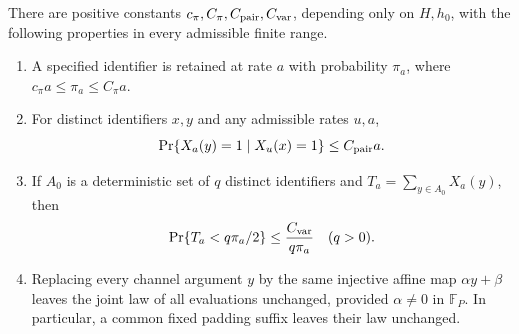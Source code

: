 \begin{lemma}\label{lem:env-ranks}
There are positive constants $c_\pi,C_\pi,C_{\rm pair},C_{\rm var}$,
depending only on $H,h_0$, with the following properties in every
admissible finite range.
\begin{enumerate}
\item A specified identifier is retained at rate $a$ with probability
$\pi_a$, where $c_\pi a\le\pi_a\le C_\pi a$.
\item For distinct identifiers $x,y$ and any admissible rates $u,a$,
\[
\Pr\{X_a(y)=1\mid X_u(x)=1\}\le C_{\rm pair}a.
\]
\item If $A_0$ is a deterministic set of $q$ distinct identifiers and
$T_a=\sum_{y\in A_0}X_a(y)$, then
\[
\Pr\{T_a<q\pi_a/2\}\le \frac{C_{\rm var}}{q\pi_a}
\quad(q>0).
\]
\item Replacing every channel argument $y$ by the same injective affine
map $\alpha y+\beta$ leaves the joint law of all evaluations unchanged,
provided $\alpha\ne0$ in $\mathbb F_P$. In particular, a common fixed
padding suffix leaves their law unchanged.
\end{enumerate}
\end{lemma}

